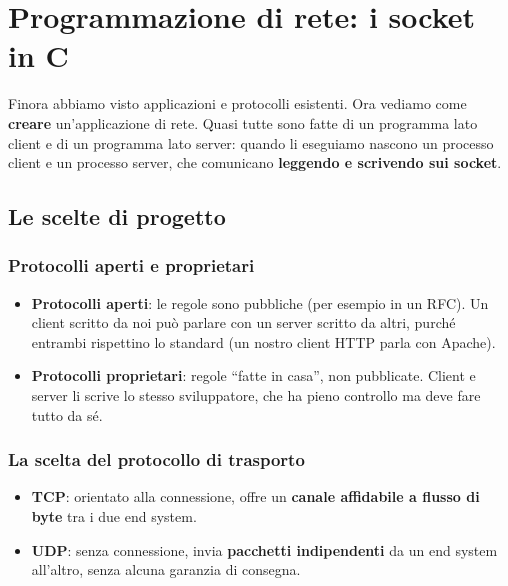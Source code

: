 \chapter{Programmazione di rete: i socket in C}

Finora abbiamo visto applicazioni e protocolli esistenti. Ora vediamo come \textbf{creare} un'applicazione
di rete. Quasi tutte sono fatte di un programma lato client e di un programma lato server: quando li
eseguiamo nascono un processo client e un processo server, che comunicano \textbf{leggendo e scrivendo sui
socket}.

\section{Le scelte di progetto}

\subsection{Protocolli aperti e proprietari}

\begin{itemize}
    \item \textbf{Protocolli aperti}: le regole sono pubbliche (per esempio in un RFC). Un client scritto da noi
          può parlare con un server scritto da altri, purché entrambi rispettino lo standard (un nostro client HTTP
          parla con Apache).
    \item \textbf{Protocolli proprietari}: regole ``fatte in casa'', non pubblicate. Client e server li scrive lo
          stesso sviluppatore, che ha pieno controllo ma deve fare tutto da sé.
\end{itemize}

\subsection{La scelta del protocollo di trasporto}

\begin{itemize}
    \item \textbf{TCP}: orientato alla connessione, offre un \textbf{canale affidabile a flusso di byte} tra i due end system.
    \item \textbf{UDP}: senza connessione, invia \textbf{pacchetti indipendenti} da un end system all'altro, senza
          alcuna garanzia di consegna.
\end{itemize}

